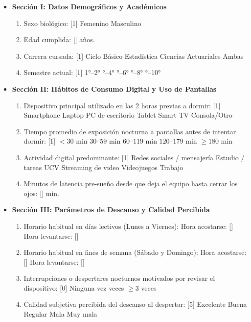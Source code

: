 \documentclass[12pt, letterpaper]{article}
\begin{document}
\begin{itemize}[leftmargin=*]
    \item \textbf{Sección I: Datos Demográficos y Académicos}
    \begin{enumerate}
        \item Sexo biológico: [1] Femenino \quad [2] Masculino
        \item Edad cumplida: [\hspace{1.5cm}] años.
        \item Carrera cursada: [1] Ciclo Básico \quad [2] Estadística \quad [3] Ciencias Actuariales \quad [4] Ambas
        \item Semestre actual: [1] 1°--2° °--4° °--6° °--8° °--10°
    \end{enumerate}

    \item \textbf{Sección II: Hábitos de Consumo Digital y Uso de Pantallas}
    \begin{enumerate}[resume]
        \item Dispositivo principal utilizado en las 2 horas previas a dormir: [1] Smartphone \quad [2] Laptop \quad [3] PC de escritorio \quad [4] Tablet \quad [5] Smart TV \quad [6] Consola/Otro
        \item Tiempo promedio de exposición nocturna a pantallas antes de intentar dormir: [1] $<30$ min \quad [2] $30\text{--}59$ min \quad [3] $60\text{--}119$ min \quad [4] $120\text{--}179$ min \quad [5] $\ge 180$ min
        \item Actividad digital predominante: [1] Redes sociales / mensajería \quad [2] Estudio / tareas UCV \quad [3] Streaming de video \quad [4] Videojuegos \quad [5] Trabajo
        \item Minutos de latencia pre-sueño desde que deja el equipo hasta cerrar los ojos: [\hspace{1.5cm}] min.
    \end{enumerate}

    \item \textbf{Sección III: Parámetros de Descanso y Calidad Percibida}
    \begin{enumerate}[resume]
        \item Horario habitual en días lectivos (Lunes a Viernes): Hora acostarse: [\hspace{1.5cm}] \quad Hora levantarse: [\hspace{1.5cm}]
        \item Horario habitual en fines de semana (Sábado y Domingo): Hora acostarse: [\hspace{1.5cm}] \quad Hora levantarse: [\hspace{1.5cm}]
        \item Interrupciones o despertares nocturnos motivados por revisar el dispositivo: [0] Ninguna  vez  veces \quad [3] $\ge 3$ veces
        \item Calidad subjetiva percibida del descanso al despertar: [5] Excelente \quad [4] Buena \quad [3] Regular \quad [2] Mala \quad [1] Muy mala
    \end{enumerate}
\end{itemize}
\end{document}
